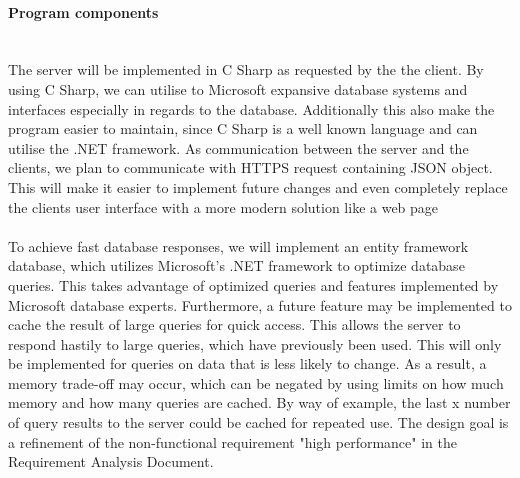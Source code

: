\paragraph{Program components}\mbox{}\\
The server will be implemented in C Sharp as requested by the the client. By using C Sharp, we can utilise to Microsoft expansive database systems and interfaces especially in regards to the database. Additionally this also make the program easier to maintain, since C Sharp is a well known language and can utilise the .NET framework. As communication between the server and the clients, we plan to communicate with HTTPS  request containing JSON object. This will make it easier to implement future changes and even completely replace the clients user interface with a more modern solution like a web page
\\\\
To achieve fast database responses, we will implement an entity framework database, which utilizes Microsoft's .NET framework to optimize database queries. This takes advantage of optimized queries and features implemented by Microsoft database experts. Furthermore, a future feature may be implemented to cache the result of large queries for quick access. This allows the server to respond hastily to large queries, which have previously been used. This will only be implemented for queries on data that is less likely to change. As a result, a memory trade-off may occur, which can be negated by using limits on how much memory and how many queries are cached. By way of example, the last x number of query results to the server could be cached for repeated use. The design goal is a refinement of the non-functional requirement "high performance" in the Requirement Analysis Document.